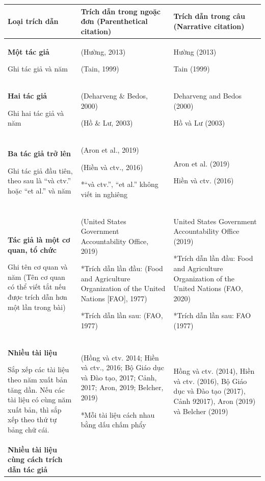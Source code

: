 \documentclass[a4paper,oneside]{thesis}
\begin{document}
\begin{table}
\centering
\begin{tabular}{|l|l|l|}
    \hline
      Loại trích dẫn   & Trích dẫn trong ngoặc đơn (Parenthetical citation) & Trích dẫn trong câu 
(Narrative citation)
\\
     \hline
       \textbf{Một tác giả}
       
Ghi tác giả và năm
  & (Hường, 2013)
  
(Tain, 1999)
 & Hường (2013)
 
Tain (1999)
\\
    \hline
   \textbf{Hai tác giả}
   
Ghi hai tác giả và năm		
      & (Deharveng $\&$ Bedos, 2000) 
      
(Hồ $\&$ Lư, 2003) & Deharveng and Bedos (2000)

Hồ và Lư (2003)\\
         \hline
       \textbf{Ba tác giả trở lên}
       
Ghi tác giả đầu tiên, theo sau là ``và ctv.'' hoặc ``et al.'' và năm 
  & (Aron et al., 2019)
  
(Hiền và ctv., 2016)

*``và ctv.'', ``et al.'' không viết in nghiêng
 & Aron et al. (2019)
 
Hiền và ctv. (2016)
\\
\hline
  \textbf{Tác giả là một cơ quan, tổ chức}
  
Ghi tên cơ quan và năm (Tên cơ quan có thể viết tắt nếu được trích dẫn hơn một lần trong bài)
       &  (United States Government Accountability Office, 2019)

*Trích dẫn lần đầu:
 (Food and Agriculture Organization of the United Nations [FAO], 1977)
 
*Trích dẫn lần sau:
(FAO, 1977)
 & United States Government Accountability Office (2019)

*Trích dẫn lần đầu:
Food and Agriculture Organization of the United Nations (FAO, 2020)

*Trích dẫn lần sau:
FAO (1977)
 \\
      \hline
       \textbf{Nhiều tài liệu}
       
Sắp xếp các tài liệu theo năm xuất bản tăng dần. Nếu các tài liệu có cùng năm xuất bản, thì sắp xếp theo thứ tự bảng chữ cái.
  & (Hồng và ctv. 2014; Hiền và ctv., 2016; Bộ Giáo dục và Đào tạo, 2017; Cảnh, 2017; Aron, 2019; Belcher, 2019)
  
  *Mỗi tài liệu cách nhau bằng dấu chấm phẩy 
  & Hồng và ctv. (2014), Hiền và ctv. (2016), Bộ Giáo dục và Đào tạo (2017), Cảnh 92017), Aron (2019) và Belcher (2019) \\
         \hline
     \textbf{Nhiều tài liệu cùng cách trích dẫn tác giả}
     

\end{tabular}
\end{table}
\end{document}

